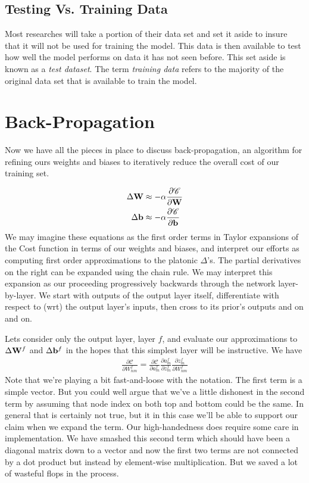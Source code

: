 \documentclass[twocolumn]{revtex4-1}
\newcommand{\bld}[1]{\vectorbold{#1}}
\newcommand{\cC}{\mathscr{C}}
\newcommand{\parpar}[2]{\frac{\partial #1}{\partial #2}}
\begin{document}
\subsection{Testing Vs. Training Data}
Most researches will take a portion of their data set and set it aside to insure that it will not be used for training the model. This data is then available to test how well the model performs on data it has not seen before. This set aside is known as a \textit{test dataset}. The term \textit{training data} refers to the majority of the original data set that is available to train the model.

\section{Back-Propagation}
Now we have all the pieces in place to discuss back-propagation, an algorithm for refining ours weights and biases to iteratively reduce the overall cost of our training set. 

\begin{align}
    \label{eqn:deltas}
    \Delta \bld{W} & \approx - \alpha \parpar{\cC}{\bld{W}} \\
    \Delta \bld{b} & \approx - \alpha \parpar{\cC}{\bld{b}}
\end{align}
We may imagine these equations as the first order terms in Taylor expansions of the Cost function in terms of our weights and biases, and interpret our efforts as computing first order approximations to the platonic $\Delta$'s. The partial derivatives on the right can be expanded using the chain rule. We may interpret this expansion as our proceeding progressively backwards through the network layer-by-layer. We start with outputs of the output layer itself, differentiate with respect to (wrt) the output layer's inputs, then cross to its prior's outputs and on and on.

Lets consider only the output layer, layer $f$, and evaluate our approximations to $\Delta \bld{W}^f$ and $\Delta \bld{b}^f$ in the hopes that this simplest layer will be instructive. We have
\begin{align}
    \parpar{\cC}{W^f_{n m}} = \parpar{\cC}{a^f_m} \parpar{a^f_m}{z^f_m} \parpar{z^f_m}{W^f_{n m}}
\end{align}
Note that we're playing a bit fast-and-loose with the notation. The first term is a simple vector. But you could well argue that we've a little dishonest in the second term by assuming that node index on both top and bottom could be the same. In general that is certainly not true, but it in this case we'll be able to support our claim when we expand the term. Our high-handedness does require some care in implementation. We have smashed this second term which should have been a diagonal matrix down to a vector and now the first two terms are not connected by a dot product but instead by element-wise multiplication. But we saved a lot of wasteful flops in the process. 
\end{document}
